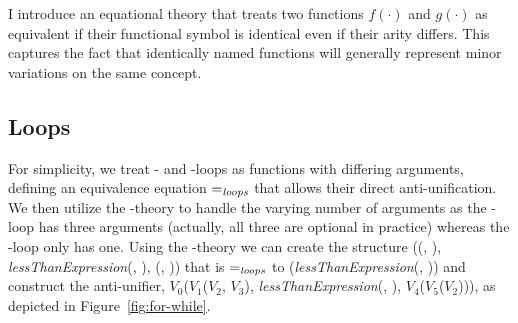 I introduce an equational theory that treats two functions $f(\cdot)$ and $g(\cdot)$ as equivalent if their functional symbol is identical even if their arity differs.  This captures the fact that identically named functions will generally represent minor variations on the same concept.

\subsection{Loops}

For simplicity, we treat - and -loops as functions with differing arguments, defining an equivalence equation $=_{\mathit{loops}}$ that allows their direct anti-unification. We then utilize the \NIL{}-theory to handle the varying number of arguments as the -loop has three arguments (actually, all three are optional in practice) whereas the -loop only has one. Using the \NIL{}-theory we can create the structure (\NIL{}(\NIL{}, \NIL{}), \textit{lessThanExpression}(, ), \NIL{}(\NIL{}, \NIL{})) that is $=_{\mathit{loops}}$ to (\textit{lessThanExpression}(, )) and construct the anti-unifier, $V_0$($V_1$($V_2$, $V_3$), \textit{lessThanExpression}(, ), $V_4$($V_5$($V_2$))), as depicted in Figure~\ref{fig:for-while}.

